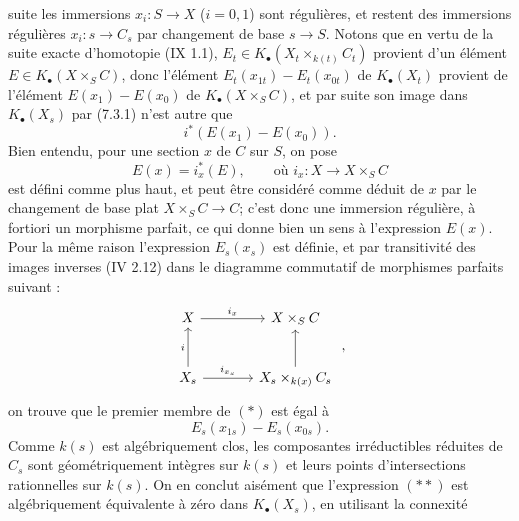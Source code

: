
suite les immersions \(x_i:S\to X\) (\(i=0,1\)) sont régulières, et restent des immersions régulières \(x_i:s\to C_s\) par changement de base \(s\to S\). Notons que en vertu de la suite exacte d'homotopie (IX 1.1), \(E_t\in K_\bullet(X_t\times_{k(t)}C_t)\) provient d'un élément \(E\in K_\bullet(X\times_SC)\), donc l'élément \(E_t(x_{1t})-E_t(x_{0t})\) de \(K_\bullet(X_t)\) provient de l'élément \(E(x_1)-E(x_0)\) de \(K_\bullet(X\times_SC)\), et par suite son image dans \(K_\bullet(X_s)\) par (7.3.1) n'est autre que
\[
  i^*(E(x_1)-E(x_0)).
  \tag{*}
\]
Bien entendu, pour une section \(x\) de \(C\) sur \(S\), on pose
\[
  E(x)=i_x^*(E),\qquad\text{où } i_x:X\longrightarrow X\times_SC
\]
est défini comme plus haut, et peut être considéré comme déduit de \(x\) par le changement de base plat \(X\times_SC\to C\); c'est donc une immersion régulière, à fortiori un morphisme parfait, ce qui donne bien un sens à l'expression \(E(x)\). Pour la même raison l'expression \(E_s(x_s)\) est définie, et par transitivité des images inverses (IV 2.12) dans le diagramme commutatif de morphismes parfaits suivant :
\[
\begin{tikzcd}[column sep=large,row sep=large]
X \arrow[r,"i_x"] & X\times_SC\\
X_s \arrow[u,"i"] \arrow[r,"i_{x_s}"] & X_s\times_{k(x)}C_s \arrow[u]
\end{tikzcd}
\;,
\]
on trouve que le premier membre de \((*)\) est égal à
\[
  E_s(x_{1s})-E_s(x_{0s}).
  \tag{**}
\]
Comme \(k(s)\) est algébriquement clos, les composantes irréductibles réduites de \(C_s\) sont géométriquement intègres sur \(k(s)\) et leurs points d'intersections rationnelles sur \(k(s)\). On en conclut aisément que l'expression \((**)\) est algébriquement équivalente à zéro dans \(K_\bullet(X_s)\), en utilisant la connexité
